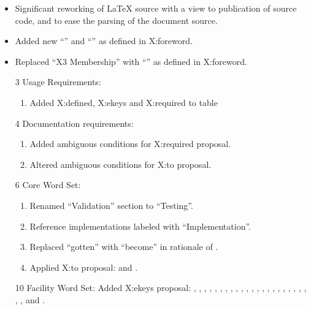	\begin{itemize}
	\item Significant reworking of \LaTeX{} source with a view to
		publication of source code, and to ease the parsing of the
		document source.

	\item Added new ``'' and ``'' as defined
		in \textsf{X:foreword}.

	\item Replaced ``X3 Membership'' with ``'' as
		defined in \textsf{X:foreword}.

	\item[3] Usage Requirements:
		\begin{enumerate}
		\item Added
			\textsf{X:defined},
			\textsf{X:ekeys} and
			\textsf{X:required}
			to table 
		\end{enumerate}

	\item[4] Documentation requirements:
		\begin{enumerate}
		\item Added ambiguous conditions for \textsf{X:required} proposal.
		\item Altered ambiguous conditions for \textsf{X:to} proposal.
		\end{enumerate}

	\item[6] Core Word Set:
		\begin{enumerate}
		\item Renamed ``Validation'' section to ``Testing''.
		\item Reference implementations labeled with ``Implementation''.
		\item Replaced ``gotten'' with ``become'' in rationale of
			.
		\item Applied \textsf{X:to} proposal:
			 and .
		\end{enumerate}

	\item[10] Facility Word Set:
		Added \textsf{X:ekeys} proposal:
		,
		,
		,
		,
		,
		,
		,
		,
		,
		,
		,
		,
		,
		,
		,
		,
		, \linebreak
		,
		,
		,
		,
		,
		,
		,
		 and
		.


\end{itemize}
